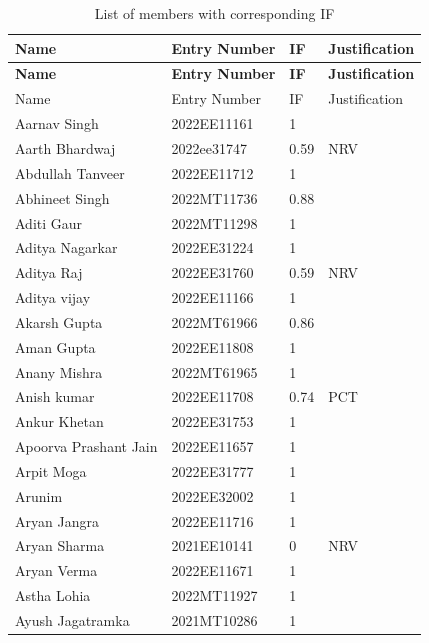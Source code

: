 \documentclass[12pt,a4paper]{article}
\begin{document}
\begin{longtable}{|l|l|l|l|}
\caption{List of members with corresponding IF} \label{tab:List of members with corresponding IF} \\ 
    \hline
    \textbf{Name} & \textbf{Entry Number} & \textbf{IF} & \textbf{Justification} \\ \hline
    \endfirsthead
    \hline
    \textbf{Name} & \textbf{Entry Number} & \textbf{IF} & \textbf{Justification} \\ \hline
    \endhead
    \hline
    \endfoot
    Name & Entry Number & IF & Justification \\ \hline
        Aarnav  Singh & 2022EE11161 & 1 & ~ \\ \hline
        Aarth Bhardwaj & 2022ee31747 & 0.59 & NRV \\ \hline
        Abdullah Tanveer & 2022EE11712 & 1 & ~ \\ \hline
        Abhineet Singh & 2022MT11736 & 0.88 & ~ \\ \hline
        Aditi Gaur & 2022MT11298 & 1 & ~ \\ \hline
        Aditya Nagarkar & 2022EE31224 & 1 & ~ \\ \hline
        Aditya Raj & 2022EE31760 & 0.59 & NRV \\ \hline
        Aditya vijay & 2022EE11166 & 1 & ~ \\ \hline
        Akarsh Gupta & 2022MT61966 & 0.86 & ~ \\ \hline
        Aman Gupta & 2022EE11808 & 1 & ~ \\ \hline
        Anany Mishra & 2022MT61965 & 1 & ~ \\ \hline
        Anish kumar & 2022EE11708 & 0.74 & PCT \\ \hline
        Ankur Khetan & 2022EE31753 & 1 & ~ \\ \hline
        Apoorva Prashant Jain & 2022EE11657 & 1 & ~ \\ \hline
        Arpit Moga & 2022EE31777 & 1 & ~ \\ \hline
        Arunim & 2022EE32002 & 1 & ~ \\ \hline
        Aryan Jangra & 2022EE11716 & 1 & ~ \\ \hline
        Aryan Sharma & 2021EE10141 & 0 & NRV \\ \hline
        Aryan Verma & 2022EE11671 & 1 & ~ \\ \hline
        Astha Lohia & 2022MT11927 & 1 & ~ \\ \hline
        Ayush Jagatramka & 2021MT10286 & 1 & ~ \\ \hline

\end{longtable}
\end{document}
